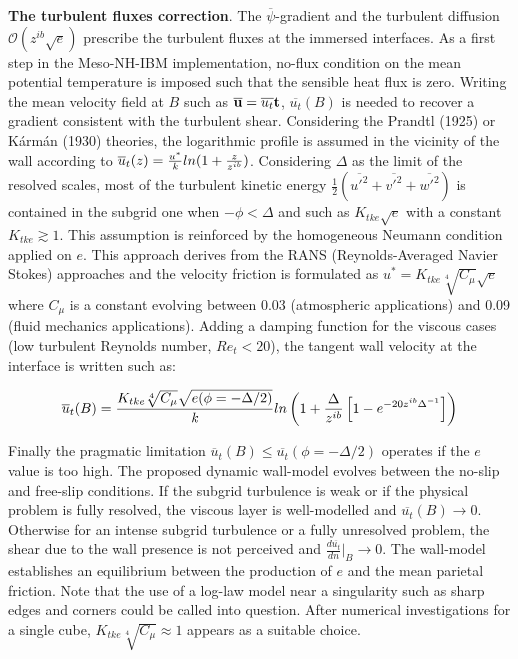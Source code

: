 {\bf The turbulent fluxes correction}. The $\overline{\psi}$-gradient and the turbulent diffusion $\mathcal{O}(z^{ib}\sqrt{e})$ prescribe the turbulent fluxes at the immersed interfaces. As a first step in the Meso-NH-IBM implementation, no-flux condition on the mean potential temperature is imposed such that the sensible heat flux is zero. Writing the mean velocity field at $B$ such as $\overline{{\bf u}}=\overline{u_t}{\bf t}$, $\overline{u_t}(B)$ is needed to recover a gradient consistent with the turbulent shear. Considering the Prandtl (1925) or K\'arm\'an (1930) theories, the logarithmic profile is assumed in the vicinity of the wall according to $\overline{u}_t(z)  = \frac{u^*}{{\it k}} ln (1+\frac{z}{z^{ib}})$. Considering $\Delta$ as the limit of the resolved scales, most of the turbulent kinetic energy $\frac{1}{2}(\overline{u'^2}+\overline{v'^2}+\overline{w'^2})$ is contained in the subgrid one when $-\phi<\Delta$ and such as $K_{tke}\sqrt{e}$ with a constant $K_{tke} \gtrsim 1$. This assumption is reinforced by the homogeneous Neumann condition applied on $e$. This approach derives from the RANS (Reynolds-Averaged Navier Stokes) approaches and the velocity friction is formulated as $u^*=K_{tke}\sqrt[4]{C_\mu}\sqrt{e}$ where $C_\mu$ is a constant evolving between 0.03 (atmospheric applications) and 0.09 (fluid mechanics applications). Adding a damping function for the viscous cases (low turbulent Reynolds number, $Re_t<20$), the tangent wall velocity at the interface is written such as: 

\vspace{-0.25cm}
\begin{equation}
\overline{u}_t(B) = \frac{K_{tke}\sqrt[4]{C_\mu}\sqrt{e(\phi=-\Delta/2)}}{\it k}ln \left(1+\frac{\Delta}{z^{ib}} \left [1-e^{-20z^{ib}\Delta^{-1}} \right] \right)
\label{eqn_les}
\end{equation} 
\vspace{-0.25cm}

Finally the pragmatic limitation $\overline{u}_t(B) \le \overline{u_t}(\phi=-\Delta /2)$ operates if the $e$ value is too high. The proposed dynamic wall-model evolves between the no-slip and free-slip conditions. If the subgrid turbulence is weak or if the physical problem is fully resolved, the viscous layer is well-modelled and $\overline{u_t}(B) \rightarrow 0$. Otherwise for an intense subgrid turbulence or a fully unresolved problem, the shear due to the wall presence is not perceived and $\frac{d \overline{u_t}}{d n}\big|_{B} \rightarrow 0$. The wall-model establishes an equilibrium between the production of $e$ and the mean parietal friction. Note that the use of a log-law model near a singularity such as sharp edges and corners could be called into question. After numerical investigations for a single cube, $K_{tke} \sqrt[4]{C_\mu} \approx 1$ appears as a suitable choice. 
%

